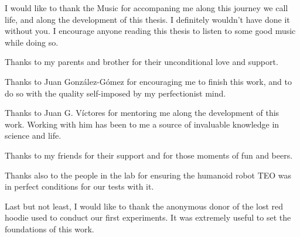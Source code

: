 I would like to thank the Music for accompaning me along this journey we call life, and along the development of this thesis. I definitely wouldn't have done it without you. I encourage anyone reading this thesis to listen to some good music while doing so.

Thanks to my parents and brother for their unconditional love and support.

Thanks to Juan González-Gómez for encouraging me to finish this work, and to do so with the quality self-imposed by my perfectionist mind.

Thanks to Juan G. Víctores for mentoring me along the development of this work. Working with him has been to me a source of invaluable knowledge in science and life.

Thanks to my friends for their support and for those moments of fun and beers.

Thanks also to the people in the lab for  ensuring the humanoid robot TEO was in perfect conditions for our tests with it.

Last but not least, I would like to thank the anonymous donor of the lost red hoodie used to conduct our first experiments. It was extremely useful to set the foundations of this work.